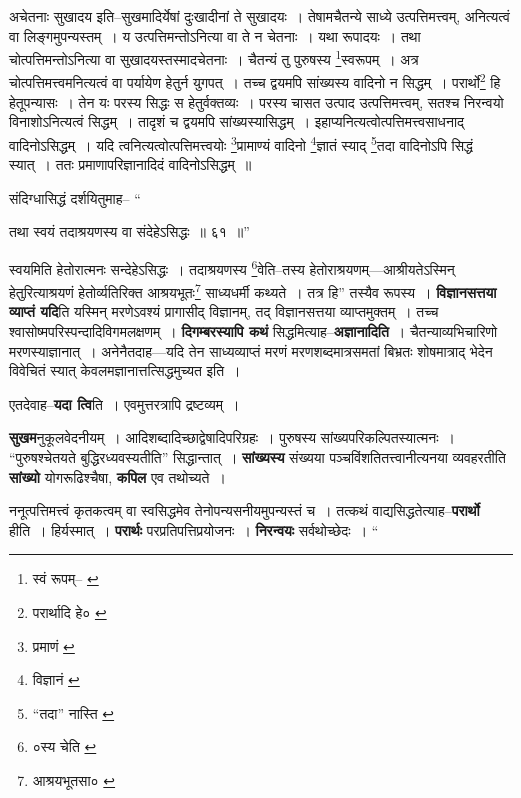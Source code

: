 \documentclass[article,12pt,a4paper]{memoir}
\begin{document}
	अचेतनाः सुखादय इति--सुखमादिर्येषां दुःखादीनां ते सुखादयः । तेषामचैतन्ये साध्ये उत्पत्तिमत्त्वम्, अनित्यत्वं वा लिङ्गमुपन्यस्तम् । य उत्पत्तिमन्तोऽनित्या वा ते न चेतनाः । यथा रूपादयः । तथा चोत्पत्तिमन्तोऽनित्या वा सुखादयस्तस्मादचेतनाः । चैतन्यं तु पुरुषस्य \footnote{स्वं रूपम्--\cite{dp-msA} \cite{dp-msB} \cite{dp-edP} \cite{dp-edH} \cite{dp-edN}}\-स्वरूपम् । अत्र चोत्पत्तिमत्त्वमनित्यत्वं वा पर्यायेण हेतुर्न युगपत् । तच्च द्वयमपि सांख्यस्य वादिनो न सिद्धम् । परार्थो\footnote{परार्थादि हे० \cite{dp-msB}} हि हेतूपन्यासः । तेन यः परस्य सिद्धः स हेतुर्वक्तव्यः । परस्य चासत उत्पाद उत्पत्तिमत्त्वम्, सतश्च निरन्वयो विनाशोऽनित्यत्वं सिद्धम् । तादृशं च द्वयमपि सांख्यस्यासिद्धम् । इहाप्यनित्यत्वोत्पत्तिमत्त्वसाधनाद् वादिनोऽसिद्धम् । यदि त्वनित्यत्वोत्पत्तिमत्त्वयोः \footnote{प्रमाणं \cite{dp-msA} \cite{dp-msC} \cite{dp-edP} \cite{dp-edH} \cite{dp-edE} \cite{dp-edN}}\-प्रामाण्यं वादिनो \footnote{विज्ञानं \cite{dp-msC}}\-ज्ञातं स्याद् \footnote{“तदा” नास्ति \cite{dp-msA} \cite{dp-edP} \cite{dp-edH} \cite{dp-edE} \cite{dp-edN}}\-तदा वादिनोऽपि सिद्धं स्यात् । ततः प्रमाणापरिज्ञानादिदं वादिनोऽसिद्धम् ॥ 
	  
	संदिग्धासिद्धं दर्शयितुमाह-- “
	  
	तथा स्वयं तदाश्रयणस्य वा संदेहेऽसिद्धः ॥ ६१ ॥” 
	  
	स्वयमिति हेतोरात्मनः सन्देहेऽसिद्धः । तदाश्रयणस्य \footnote{०स्य चेति \cite{dp-msA} \cite{dp-msB} \cite{dp-msC} \cite{dp-msD} \cite{dp-edP} \cite{dp-edH} \cite{dp-edE}}\-वेति--तस्य हेतोराश्रयणम्—आश्रीयतेऽस्मिन् हेतुरित्याश्रयणं हेतोर्व्यतिरिक्त आश्रयभूतः\footnote{आश्रयभूतसा० \cite{dp-edE}} साध्यधर्मी कथ्यते । तत्र हि” तस्यैव रूपस्य । \textbf{विज्ञानसत्तया व्याप्तं यदि}ति यस्मिन् मरणेऽवश्यं प्रागासीद् विज्ञानम्, तद् विज्ञानसत्तया व्याप्तमुक्तम् । तच्च श्वासोष्मपरिस्पन्दादिविगमलक्षणम् । \textbf{दिगम्बरस्यापि कथं} सिद्धमित्याह--\textbf{अज्ञानादिति} । चैतन्याव्यभिचारिणो मरणस्याज्ञानात् । अनेनैतदाह—यदि तेन साध्यव्याप्तं मरणं मरणशब्दमात्रसमतां बिभ्रतः शोषमात्राद् भेदेन विवेचितं स्यात् केवलमज्ञानात्तत्सिद्धमुच्यत इति ।
	\pend
      

	  \pstart एतदेवाह--\textbf{यदा त्वि}ति । एवमुत्तरत्रापि द्रष्टव्यम् ।
	\pend
      

	  \pstart \textbf{सुखम}नुकूलवेदनीयम् । आदिशब्दादिच्छाद्वेषादिपरिग्रहः । पुरुषस्य सांख्यपरिकल्पितस्यात्मनः । “पुरुषश्चेतयते बुद्धिरध्यवस्यतीति” सिद्धान्तात् । \textbf{सांख्यस्य} संख्यया पञ्चविंशतितत्त्वानीत्यनया व्यवहरतीति \textbf{सांख्यो} योगरूढिश्चैषा, \textbf{कपिल} एव तथोच्यते ।
	\pend
      

	  \pstart ननूत्पत्तिमत्त्वं कृतकत्वम् वा स्वसिद्धमेव तेनोपन्यसनीयमुपन्यस्तं च । तत्कथं वाद्यसिद्धतेत्याह--\textbf{परार्थो} हीति । हिर्यस्मात् । \textbf{परार्थः} परप्रतिपत्तिप्रयोजनः । \textbf{निरन्वयः} सर्वथोच्छेदः ।  \leavevmode{} “
	  
\end{document}
